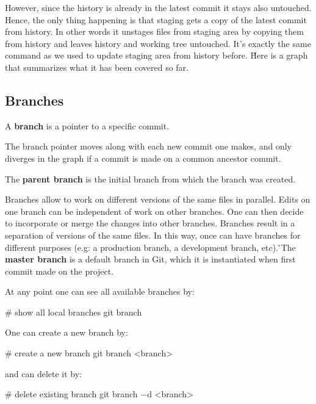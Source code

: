 However, since the history is already in the latest commit it stays also untouched. Hence, the only thing happening
is that staging gets a copy of the latest commit from history. In other words it unstages files from staging area by
copying them from history and leaves history and working tree untouched. It’s exactly the same command as we used to
update staging area from history before. \v

Here is a graph that summarizes what it has been covered so far.


\subsection{Branches}

\bd[Branch]
A \textbf{branch} is a pointer to a specific commit.
\ed

The branch pointer moves along with each new commit one makes, and only diverges in the graph if a commit is made on a
common ancestor commit.

The \textbf{parent branch} is the initial branch from which the branch was created.
\ed

Branches allow to work on different versions of the same files in parallel. Edits on one branch can be independent of
work on other branches. One can then decide to incorporate or merge the changes into other branches. Branches result
in a separation of versions of the same files. In this way, once can have branches for different purposes (e.g: a
production branch, a development branch, etc). \v

The \textbf{master branch} is a default branch in Git, which it is instantiated when first commit made on the project.
\ed

At any point one can see all available branches by:

\begin{bash}
# show all local branches
git branch
\end{bash}

One can create a new branch by:

\begin{bash}
# create a new branch
git branch <branch>
\end{bash}

and can delete it by:

\begin{bash}
# delete existing branch
git branch $-$d <branch>
\end{bash}

